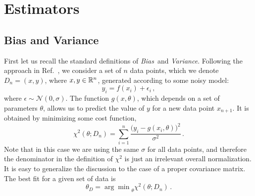 \section{Estimators}
\label{sec:estimators}

\subsection{Bias and Variance}
\label{sec:BandV}

First let us recall the standard definitions of {\em Bias}\ and {\em Variance}.
Following the approach in Ref.~\cite{Mehta:2018dln}, we consider a set of $n$
data points, which we denote $D_n=\left(x,y\right)$, where $x,y \in \mathbb{R}^n$,
generated according to some noisy model:
\begin{equation}
    \label{eq:NoisyData}
    y_i = f(x_i) + \epsilon_i\, ,    
\end{equation}
where $\epsilon\sim\mathcal{N}(0,\sigma)$. The function $g(x,\theta)$, which
depends on a set of parameters $\theta$, allows us to predict the value of $y$
for a new data point $x_{n+1}$. It is obtained by minimizing some cost function,
\eg
\begin{equation}
    \label{eq:CostFuncChi}
    \chi^2(\theta; D_n) = \sum_{i=1}^n 
    \frac{\Big(
        y_i - g(x_i,\theta)
    \Big)^2}{\sigma^2}\, . 
\end{equation}
Note that in this case we are using the same $\sigma$ for all data points, and
therefore the denominator in the definition of $\chi^2$ is just an irrelevant
overall normalization. It is easy to generalize the discussion to the case of a
proper covariance matrix. The best fit for a given set of data is 
\begin{equation}
    \label{eq:ThetaMin}
    \theta_D = {\arg\min}_\theta \chi^2(\theta; D_n)\, .
\end{equation}

